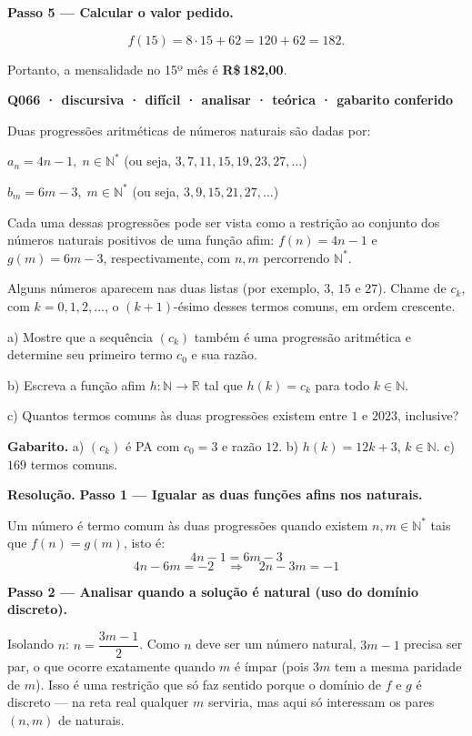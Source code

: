 \documentclass[11pt,a4paper]{article}
\begin{document}
\textbf{Passo 5 — Calcular o valor pedido.}

$$f(15) = 8\cdot 15 + 62 = 120 + 62 = 182.$$

Portanto, a mensalidade no 15º mês é \textbf{R\$\,182,00}.

\bigskip\noindent\textbf{Q066 · discursiva · difícil · analisar · teórica · gabarito conferido}\par\nopagebreak
Duas progressões aritméticas de números naturais são dadas por:

$a_n = 4n - 1,\; n \in \mathbb{N}^*$ (ou seja, $3, 7, 11, 15, 19, 23, 27, \dots$)

$b_m = 6m - 3,\; m \in \mathbb{N}^*$ (ou seja, $3, 9, 15, 21, 27, \dots$)

Cada uma dessas progressões pode ser vista como a restrição ao conjunto dos números naturais positivos de uma função afim: $f(n) = 4n-1$ e $g(m) = 6m-3$, respectivamente, com $n, m$ percorrendo $\mathbb{N}^*$.

Alguns números aparecem nas duas listas (por exemplo, $3$, $15$ e $27$). Chame de $c_k$, com $k = 0, 1, 2, \dots$, o $(k+1)$-ésimo desses termos comuns, em ordem crescente.

a) Mostre que a sequência $(c_k)$ também é uma progressão aritmética e determine seu primeiro termo $c_0$ e sua razão.

b) Escreva a função afim $h: \mathbb{N} \to \mathbb{R}$ tal que $h(k) = c_k$ para todo $k \in \mathbb{N}$.

c) Quantos termos comuns às duas progressões existem entre $1$ e $2023$, inclusive?

\textbf{Gabarito.} a) $(c_k)$ é PA com $c_0=3$ e razão $12$. b) $h(k)=12k+3$, $k\in\mathbb{N}$. c) $169$ termos comuns.

\textbf{Resolução.} \textbf{Passo 1 — Igualar as duas funções afins nos naturais.}

Um número é termo comum às duas progressões quando existem $n, m \in \mathbb{N}^*$ tais que $f(n) = g(m)$, isto é:
$$4n - 1 = 6m - 3$$
$$4n - 6m = -2 \quad\Longrightarrow\quad 2n - 3m = -1$$

\textbf{Passo 2 — Analisar quando a solução é natural (uso do domínio discreto).}

Isolando $n$: $n = \dfrac{3m-1}{2}$. Como $n$ deve ser um número natural, $3m - 1$ precisa ser par, o que ocorre exatamente quando $m$ é ímpar (pois $3m$ tem a mesma paridade de $m$). Isso é uma restrição que só faz sentido porque o domínio de $f$ e $g$ é discreto — na reta real qualquer $m$ serviria, mas aqui só interessam os pares $(n,m)$ de naturais.
\end{document}
